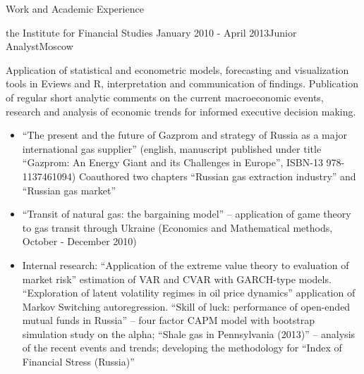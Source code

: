 \documentclass{resume} %
\begin{document}
\begin{rSection}{Work and Academic Experience}
\begin{rSubsection}{
        the Institute for Financial Studies
    }{January 2010 - April 2013}{Junior Analyst}{Moscow}
    \item Application of statistical and econometric models, forecasting and visualization tools in Eviews and R, interpretation and communication of findings. Publication of regular short analytic comments on the current macroeconomic events, research and analysis of economic trends for informed executive decision making.

    \begin{itemize}
        \item ``The present and the future of Gazprom and strategy of Russia as a major international gas supplier'' (english, manuscript published under title ``Gazprom: An Energy Giant and its Challenges in Europe'', ISBN-13 978-1137461094) Coauthored two chapters ``Russian gas extraction industry'' and ``Russian gas market''

        \item ``Transit of natural gas: the bargaining model'' -- application of game theory to gas transit through Ukraine (Economics and Mathematical methods, October - December 2010)

        \item Internal research: ``Application of the extreme value theory to evaluation of market risk'' estimation of VAR and CVAR with GARCH-type models. ``Exploration of latent volatility regimes in oil price dynamics'' application of Markov Switching autoregression. ``Skill of luck: performance of open-ended mutual funds in Russia'' -- four factor CAPM model with bootstrap simulation study on the alpha; ``Shale gas in Pennsylvania (2013)'' -- analysis of the recent events and trends; developing the methodology for ``Index of Financial Stress (Russia)''

    \end{itemize}
\end{rSubsection}
\end{rSection}
\end{document}
